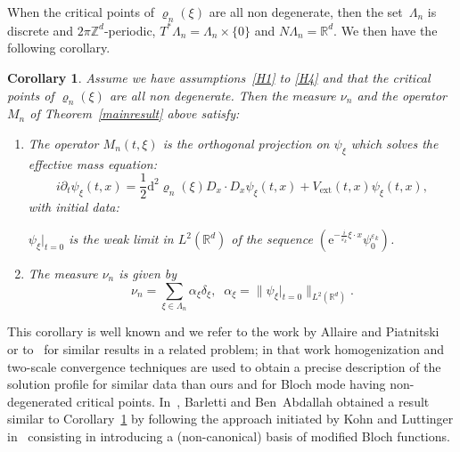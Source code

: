 \documentclass[10pt]{amsart}
\newtheorem{coro}[cdrthm]{Corollary}
\theoremstyle{definition}
\DeclareMathOperator{\ext}{ext}
\newcommand*\R{{\mathbb R}}
\newcommand*\Z{{\mathbb Z}}
\newcommand*\eps{\varepsilon}
\numberwithin{equation}{section}
\newcommand{\ee}{{\mathrm e}}
\newcommand*{\dd}{\mathrm{d}}
\begin{document}
When the critical points of $\varrho_n(\xi)$ are all non degenerate, then the set~$\Lambda_n$ is discrete and $2\pi\Z^d$-periodic, $T^*\Lambda_n=\Lambda_n\times \{0\}$ and $N\Lambda_n= \R^d$. We then have the following corollary.

\begin{coro}\label{mainresul:case1}
Assume we have assumptions~\eqref{H1} to \eqref{H4} and that the critical points of $\varrho_n(\xi)$ are all non degenerate. Then the measure $\nu_{n}$ and the operator $M_{n}$ of Theorem~\ref{mainresult} above satisfy:
\begin{enumerate}
\item \label{1.3.1} The operator $M_{n}(t,\xi)$ is the orthogonal projection on $\psi_\xi$ which solves the effective mass equation:
\begin{equation}\label{eq:schroh}
i\partial_t \psi_\xi(t,x) =\frac{1}{2}\dd^2\varrho_{n}(\xi)D_x\cdot D_x \psi_\xi(t,x) +V_{\ext}(t,x)\psi_\xi(t,x),
\end{equation}
with initial data:
\begin{center}
$\psi_\xi|_{t=0}$ is the weak limit in $L^2(\R^d)$ of the sequence $\left({\ee}^{-\frac{i}{\eps_k} \xi \cdot x} \psi^{\eps_k}_{0}\right)$.
\end{center}
\item \label{1.3.2}The measure $\nu_{n}$ is given by
\[
\nu_{n}=\sum_{\xi\in \Lambda_{n}}\alpha_\xi \delta_\xi,\;\; \alpha_\xi = \| \psi_\xi|_{t=0}\|_{L^2(\R^d)}.
\]
\end{enumerate}
\end{coro}


This corollary is well known and we refer to the work by Allaire and Piatnitski~\cite{AP05} or to~\cite{AP06} for similar results in a related problem; in that work homogenization and two-scale convergence techniques are used to obtain a precise description of the solution profile for similar data than ours and for Bloch mode having non-degenerated critical points. In~\cite{BBA11}, Barletti and Ben~Abdallah obtained a result similar to Corollary~\ref{mainresul:case1} by following the approach initiated by Kohn and Luttinger in~\cite{LuttingerKohn} consisting in introducing a (non-canonical) basis of modified Bloch functions.

\end{document}
